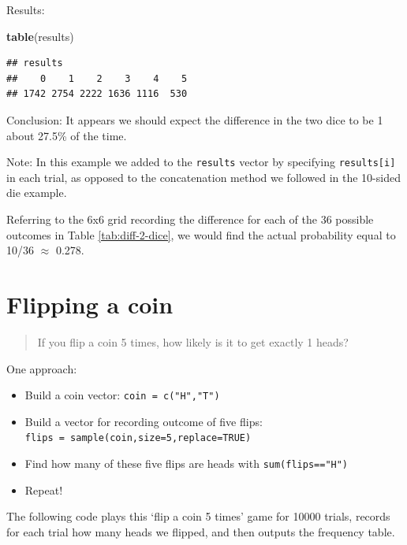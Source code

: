 \documentclass[
]{book}
\newenvironment{Shaded}{\begin{snugshade}}{\end{snugshade}}
\newcommand{\FunctionTok}[1]{\textcolor[rgb]{0.13,0.29,0.53}{\textbf{#1}}}
\newcommand{\NormalTok}[1]{#1}
\providecommand{\tightlist}{%
  \setlength{\itemsep}{0pt}\setlength{\parskip}{0pt}}
\theoremstyle{definition}
\theoremstyle{definition}
\theoremstyle{definition}
\theoremstyle{definition}
\theoremstyle{remark}
\begin{document}
Results:

\begin{Shaded}
\begin{Highlighting}[]
\FunctionTok{table}\NormalTok{(results)}
\end{Highlighting}
\end{Shaded}

\begin{verbatim}
## results
##    0    1    2    3    4    5 
## 1742 2754 2222 1636 1116  530
\end{verbatim}

Conclusion: It appears we should expect the difference in the two dice to be 1 about 27.5\% of the time.

Note: In this example we added to the \texttt{results} vector by specifying \texttt{results{[}i{]}} in each trial, as opposed to the concatenation method we followed in the 10-sided die example.

Referring to the 6x6 grid recording the difference for each of the 36 possible outcomes in Table \ref{tab:diff-2-dice}, we would find the actual probability equal to 10/36 \(\approx\) 0.278.

\section{Flipping a coin}\label{flip-coin-R}

\begin{quote}
If you flip a coin 5 times, how likely is it to get exactly 1 heads?
\end{quote}

One approach:

\begin{itemize}
\tightlist
\item
  Build a coin vector: \texttt{coin\ =\ c("H","T")}
\item
  Build a vector for recording outcome of five flips: \texttt{flips\ =\ sample(coin,size=5,replace=TRUE)}
\item
  Find how many of these five flips are heads with \texttt{sum(flips=="H")}
\item
  Repeat!
\end{itemize}

The following code plays this `flip a coin 5 times' game for 10000 trials, records for each trial how many heads we flipped, and then outputs the frequency table.
\end{document}
